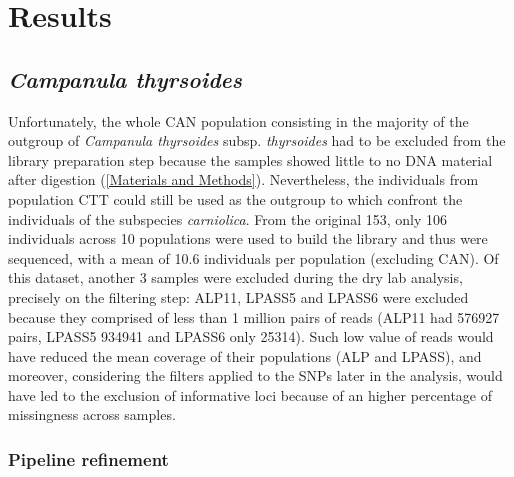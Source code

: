 \documentclass[a4paper, 12pt]{report}
\begin{document}
\clearpage
\chapter{Results}

\section{\textit{Campanula thyrsoides}}
\vspace{-1em}
Unfortunately, the whole CAN population consisting in the majority of the outgroup of \textit{Campanula thyrsoides} subsp. \textit{thyrsoides} had to be excluded from the library preparation step because the samples showed little to no DNA material after digestion (\autoref{Materials and Methods}). Nevertheless, the individuals from population CTT could still be used as the outgroup to which confront the individuals of the subspecies \textit{carniolica}. From the original 153, only 106 individuals across 10 populations were used to build the library and thus were sequenced, with a mean of 10.6 individuals per population (excluding CAN). Of this dataset, another 3 samples were excluded during the dry lab analysis, precisely on the filtering step: ALP11, LPASS5 and LPASS6 were excluded because they comprised of less than 1 million pairs of reads (ALP11 had 576927 pairs, LPASS5 934941 and LPASS6 only 25314). Such low value of reads would have reduced the mean coverage of their populations (ALP and LPASS), and moreover, considering the filters applied to the SNPs later in the analysis, would have led to the exclusion of informative loci because of an higher percentage of missingness across samples.

\subsection{Pipeline refinement}
\end{document}
